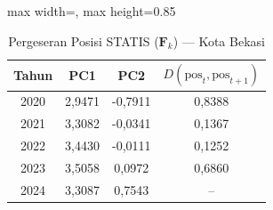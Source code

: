 \begin{table}[H]
\centering
\caption{Pergeseran Posisi STATIS ($\mathbf{F}_k$) --- Kota Bekasi} \label{tab:app2jarak_statis_skor_kota_bekasi}
\begin{adjustbox}{max width=\textwidth, max height=0.85\textheight}
\begin{tabular}{|c|c|c|c|}
\hline
\textbf{Tahun} & \textbf{PC1} & \textbf{PC2} & \textbf{$D(\text{pos}_t, \text{pos}_{t+1})$} \\
\hline
2020 & 2,9471 & -0,7911 & 0,8388 \\
2021 & 3,3082 & -0,0341 & 0,1367 \\
2022 & 3,4430 & -0,0111 & 0,1252 \\
2023 & 3,5058 & 0,0972 & 0,6860 \\
2024 & 3,3087 & 0,7543 & -- \\
\hline
\end{tabular}
\end{adjustbox}
\end{table}
